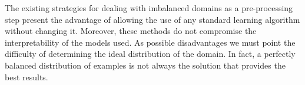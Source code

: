 \documentclass[10pt,a4paper]{article}\usepackage[]{graphicx}\usepackage[]{color}
\begin{document}
The existing strategies for dealing with imbalanced domains as a pre-processing step present the advantage of allowing the use of any standard learning algorithm without changing it. Moreover, these methods do not compromise the interpretability of the models used. As possible disadvantages we must point the difficulty of determining the ideal distribution of the domain. In fact, a perfectly balanced distribution of examples is not always the solution that provides the best results.

\newpage



\end{document}

